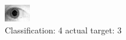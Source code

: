\begin{figure}[h!]
\begin{center}
\includegraphics[width=0.60\columnwidth]{figures/ID1826_class_4_target_3.png}
\end{center}
\caption{ Classification: 4 actual target: 3}
\label{fig:ID1826_class_4_target_3}
\end{figure}
